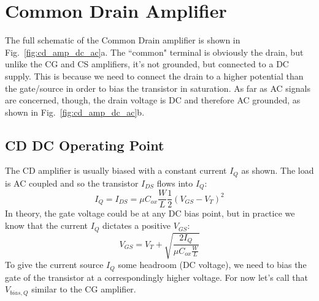 \section{Common Drain Amplifier}
The full schematic of the Common Drain amplifier is shown in Fig.~\ref{fig:cd_amp_dc_ac}a.  The ``common" terminal is obviously the drain, but unlike the CG and CS amplifiers, it's not grounded, but connected to a DC supply.  This is because we need to connect the drain to a higher potential than the gate/source in order to bias the transistor in saturation.  As far as AC signals are concerned, though, the drain voltage is DC and therefore AC grounded, as shown in Fig.~\ref{fig:cd_amp_dc_ac}b.
\subsection{CD DC Operating Point}
The CD amplifier is usually biased with a constant current $I_Q$ as shown.  The load is AC coupled and so the transistor $I_{DS}$ flows into $I_Q$:
    \begin{equation}
        I_Q = {I_{DS}} = \mu {C_{ox}}\frac{W}{L}\frac{1}{2}{({V_{GS}} - {V_T})^2}	
    \end{equation}
In theory, the gate voltage could be at any DC bias point, but in practice we know that the current $I_Q$ dictates a positive $V_{GS}$:
    \begin{equation}
        {V_{GS}} = {V_T} + \sqrt {\frac{{2{I_{Q}}}}{{\mu {C_{ox}}\frac{W}{L}}}} 
    \end{equation}
To give the current source $I_Q$ some headroom (DC voltage), we need to bias the gate of the transistor at a correspondingly higher voltage.  For now let's call that $V_{bias,Q}$ similar to the CG amplifier.
